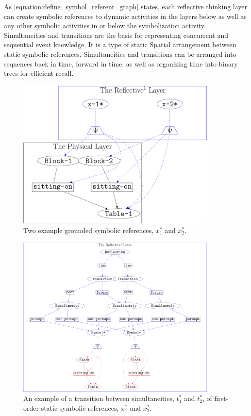 As {\mbox{\autoref{equation:define_symbol_referent_graph}}} states,
each reflective thinking layer can create symbolic references to
dynamic activities in the layers below as well as any other symbolic
activities in or below the symbolization activity.  Simultaneities and
transitions are the basis for representing concurrent and sequential
event knowledge.  It is a type of static Spatial arrangement between
static symbolic references.  Simultaneities and transitions can be
arranged into sequences back in time, forward in time, as well as
organizing time into binary trees for efficient recall.
\begin{figure}
\center
\includegraphics[width=10cm]{gfx/two_example_grounded_symbolic_references}
\caption[Two example symbolic references.]{Two example grounded
  symbolic references, $x_1^*$ and $x_2^*$.}
\label{figure:two_example_grounded_symbolic_references}
\end{figure}
\begin{figure}
\center
\includegraphics[width=10cm]{gfx/example_transition}
\caption[An example of a transition between simultaneities.]{An
  example of a transition between simultaneities, $t_1^*$ and $t_2^*$,
  of first-order static symbolic references, $x_1^*$ and $x_2^*$.}
\label{figure:example_transition}
\end{figure}

